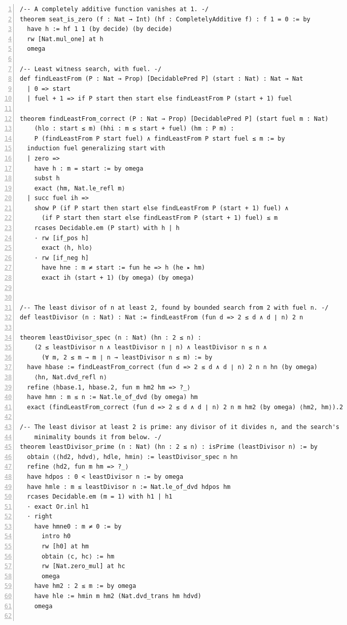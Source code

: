 \documentclass[10pt]{article}
\newcommand{\leansize}{\fontsize{5.5pt}{6.75pt}\selectfont}
\begin{document}
\begin{multicols}{2}
\begin{Verbatim}[numbers=left,firstnumber=1,numbersep=3pt,xleftmargin=2.6em,breaklines=true,breakanywhere=true,breakautoindent=false,breakindent=1.4em,breaksymbolleft={},breakanywheresymbolpre={},fontsize=\leansize]
/-- A completely additive function vanishes at 1. -/
theorem seat_is_zero (f : Nat → Int) (hf : CompletelyAdditive f) : f 1 = 0 := by
  have h := hf 1 1 (by decide) (by decide)
  rw [Nat.mul_one] at h
  omega

/-- Least witness search, with fuel. -/
def findLeastFrom (P : Nat → Prop) [DecidablePred P] (start : Nat) : Nat → Nat
  | 0 => start
  | fuel + 1 => if P start then start else findLeastFrom P (start + 1) fuel

theorem findLeastFrom_correct (P : Nat → Prop) [DecidablePred P] (start fuel m : Nat)
    (hlo : start ≤ m) (hhi : m ≤ start + fuel) (hm : P m) :
    P (findLeastFrom P start fuel) ∧ findLeastFrom P start fuel ≤ m := by
  induction fuel generalizing start with
  | zero =>
    have h : m = start := by omega
    subst h
    exact ⟨hm, Nat.le_refl m⟩
  | succ fuel ih =>
    show P (if P start then start else findLeastFrom P (start + 1) fuel) ∧
      (if P start then start else findLeastFrom P (start + 1) fuel) ≤ m
    rcases Decidable.em (P start) with h | h
    · rw [if_pos h]
      exact ⟨h, hlo⟩
    · rw [if_neg h]
      have hne : m ≠ start := fun he => h (he ▸ hm)
      exact ih (start + 1) (by omega) (by omega)


/-- The least divisor of n at least 2, found by bounded search from 2 with fuel n. -/
def leastDivisor (n : Nat) : Nat := findLeastFrom (fun d => 2 ≤ d ∧ d ∣ n) 2 n

theorem leastDivisor_spec (n : Nat) (hn : 2 ≤ n) :
    (2 ≤ leastDivisor n ∧ leastDivisor n ∣ n) ∧ leastDivisor n ≤ n ∧
      (∀ m, 2 ≤ m → m ∣ n → leastDivisor n ≤ m) := by
  have hbase := findLeastFrom_correct (fun d => 2 ≤ d ∧ d ∣ n) 2 n n hn (by omega)
    ⟨hn, Nat.dvd_refl n⟩
  refine ⟨hbase.1, hbase.2, fun m hm2 hm => ?_⟩
  have hmn : m ≤ n := Nat.le_of_dvd (by omega) hm
  exact (findLeastFrom_correct (fun d => 2 ≤ d ∧ d ∣ n) 2 n m hm2 (by omega) ⟨hm2, hm⟩).2

/-- The least divisor at least 2 is prime: any divisor of it divides n, and the search's
    minimality bounds it from below. -/
theorem leastDivisor_prime (n : Nat) (hn : 2 ≤ n) : isPrime (leastDivisor n) := by
  obtain ⟨⟨hd2, hdvd⟩, hdle, hmin⟩ := leastDivisor_spec n hn
  refine ⟨hd2, fun m hm => ?_⟩
  have hdpos : 0 < leastDivisor n := by omega
  have hmle : m ≤ leastDivisor n := Nat.le_of_dvd hdpos hm
  rcases Decidable.em (m = 1) with h1 | h1
  · exact Or.inl h1
  · right
    have hmne0 : m ≠ 0 := by
      intro h0
      rw [h0] at hm
      obtain ⟨c, hc⟩ := hm
      rw [Nat.zero_mul] at hc
      omega
    have hm2 : 2 ≤ m := by omega
    have hle := hmin m hm2 (Nat.dvd_trans hm hdvd)
    omega


\end{Verbatim}
\end{multicols}
\end{document}
